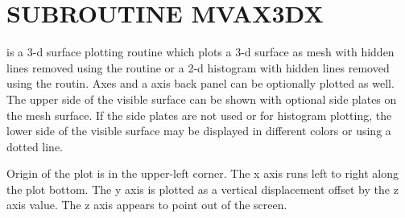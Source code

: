 \documentclass[11pt]{report}
\begin{document}
\section{SUBROUTINE MVAX3DX}

 is a 3-d surface plotting routine which plots a
3-d surface as mesh with hidden lines removed using the  routine
or a 2-d histogram with hidden lines removed using the  routin.
Axes and a axis back panel can be optionally plotted as well.
The upper side of the visible surface can be shown with optional side
plates on the mesh surface.
If the side plates are not used or for histogram plotting, the lower side of the
visible surface may be displayed in different colors or using a dotted line.

Origin of the plot is in the upper-left corner.  The x axis runs
left to right along the plot bottom.  The y axis is plotted
as a vertical displacement offset by the z axis value.  The z axis appears
to point out of the screen.
\end{document}
